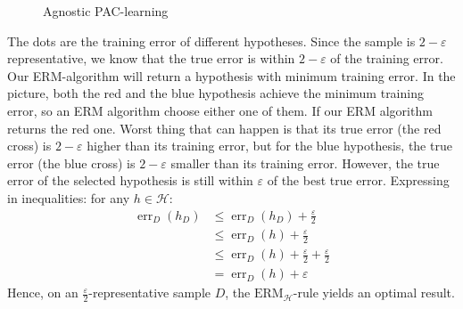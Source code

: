 \begin{enumerate}
\begin{figure}[h]
        \caption{Agnostic PAC-learning}
        \label{fig:my_label}
    \end{figure}
The dots are the training error of different hypotheses. Since the sample is $2-\varepsilon$ representative, we know that the true error is within $2-\varepsilon$ of the training error. Our ERM-algorithm will return a hypothesis with minimum training error. In the picture, both the red and the blue hypothesis achieve the minimum training error, so an ERM algorithm choose either one of them. If our ERM algorithm returns the red one. Worst thing that can happen is that its true error (the red cross) is $2-\varepsilon$ higher than its training error, but for the blue hypothesis, the true error (the blue cross) is $2-\varepsilon$ smaller than its training error. However, the true error of the selected hypothesis is still within $\varepsilon$ of the best true error. Expressing in inequalities: for any $h \in \mathcal{H}$:
\begin{equation*}
    \begin{split}
     \operatorname{err}_{D}(h_{D}) &\leq \operatorname{err}_{D}(h_{D})+\frac{\varepsilon}{2}\\
     & \leq \operatorname{err}_{D}(h)+\frac{\varepsilon}{2}\\
     & \leq \operatorname{err}_{D}(h)+\frac{\varepsilon}{2}+\frac{\varepsilon}{2}\\
     & = \operatorname{err}_{D}(h)+\varepsilon
    \end{split}
\end{equation*}
Hence, on an $\frac{\varepsilon}{2}$-representative sample $D$, the $\text{ERM}_{\mathcal{H}}$-rule yields an optimal result. 

\end{enumerate}

